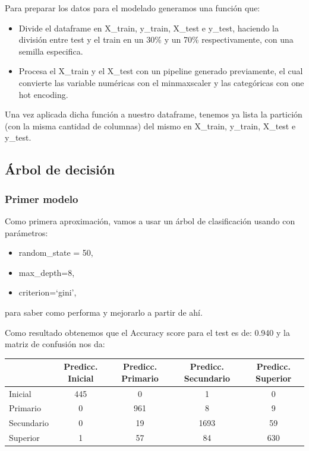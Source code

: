 \documentclass[a4paper]{article}
\begin{document}
        Para preparar los datos para el modelado generamos una función que:
        \begin{itemize}
            \item  Divide el dataframe en X\_train, y\_train, X\_test e y\_test, haciendo la división entre test y el train en un 30\% y un 70\% respectivamente, con una semilla especifica.
            \item  Procesa el X\_train y el X\_test con un pipeline generado previamente, el cual convierte las variable numéricas con el minmaxscaler y las categóricas con one hot encoding.
        \end{itemize}

        Una vez aplicada dicha función a nuestro dataframe, tenemos ya lista la partición (con la misma cantidad de columnas) del mismo en X\_train, y\_train, X\_test e y\_test.

    \subsection{Árbol de decisión}

        \subsubsection{Primer modelo}

            Como primera aproximación, vamos a usar un árbol de clasificación usando con parámetros:
            \begin{itemize}
                \item random\_state = 50,
                \item max\_depth=8,
                \item criterion=`gini',
            \end{itemize}
            para saber como performa y mejorarlo a partir de ahí.

            Como resultado obtenemos que el Accuracy score para el test es de: 0.940 y la matriz de confusión nos da:
            \begin{table}[H]
                \centering
                \begin{tabular}{|l|c|c|c|c|}
                \hline
                    ~ & Predicc. Inicial & Predicc. Primario & Predicc. Secundario & Predicc. Superior \\ \hline
                    Inicial & 445 & 0 & 1 & 0 \\ \hline
                    Primario & 0 & 961 & 8 & 9 \\ \hline
                    Secundario & 0 & 19 & 1693 & 59 \\ \hline
                    Superior & 1 & 57 & 84 & 630 \\ \hline
                \end{tabular}
            \end{table}
\end{document}
